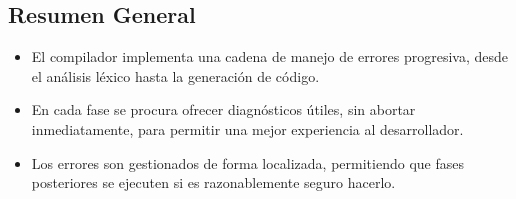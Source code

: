 \documentclass[11pt, a4paper, twoside]{article} %
\begin{document}
\subsection{Resumen General}

\begin{itemize}
    \item El compilador implementa una cadena de manejo de errores progresiva, desde el análisis léxico hasta la generación de código.
    \item En cada fase se procura ofrecer diagnósticos útiles, sin abortar inmediatamente, para permitir una mejor experiencia al desarrollador.
    \item Los errores son gestionados de forma localizada, permitiendo que fases posteriores se ejecuten si es razonablemente seguro hacerlo.
\end{itemize}
\end{document}
